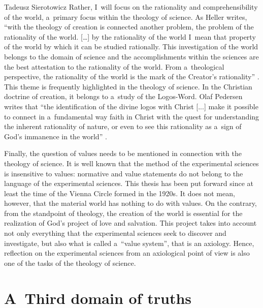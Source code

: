 \begin{artengenv}{Tadeusz Sierotowicz}
Rather, I~will focus on the rationality and comprehensibility of the world, a~primary focus within the theology of science. As Heller writes, ``with the theology of creation is connected another problem, the problem of the rationality of the world. […] by the rationality of the world I~mean that property of the world by which it can be studied rationally. This investigation of the world belongs to the domain of science and the accomplishments within the sciences are the best attestation to the rationality of the world. From a~theological perspective, the rationality of the world is the mark of the Creator's rationality'' 
\parencite[][p.21]{maczka_wstep_2015}. %
 This theme is frequently highlighted in the theology of science. In the Christian doctrine of creation, it belongs to a~study of the Logos-Word. Olaf Pedersen writes that ``the identification of the divine logos with Christ [...] make it possible to connect in a~fundamental way faith in Christ with the quest for understanding the inherent rationality of nature, or even to see this rationality as a~sign of God's immanence in the world'' 
\parencite[][p.147]{pedersen_historical_1990}.%




Finally, the question of values needs to be mentioned in connection with the theology of science. It is well known that the method of the experimental sciences is insensitive to values: normative and value statements do not belong to the language of the experimental sciences. This thesis has been put forward since at least the time of the Vienna Circle formed in the 1920s. It does not mean, however, that the material world has nothing to do with values. On the contrary, from the standpoint of theology, the creation of the world is essential for the realization of God's project of love and salvation. This project takes into account not only everything that the experimental sciences seek to discover and investigate, but also what is called a~``value system'', that is an axiology. Hence, reflection on the experimental sciences from an axiological point of view is also one of the tasks of the theology of science.



\section{A~Third domain of truths }


\end{artengenv}

